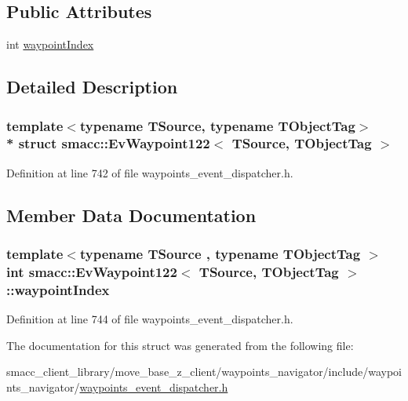 \subsection*{Public Attributes}
\begin{DoxyCompactItemize}
\item 
int \hyperlink{structsmacc_1_1EvWaypoint122_ab19c2e0159c29b6f95de8b4f071c6e8a}{waypoint\+Index}
\end{DoxyCompactItemize}


\subsection{Detailed Description}
\subsubsection*{template$<$typename T\+Source, typename T\+Object\+Tag$>$\\*
struct smacc\+::\+Ev\+Waypoint122$<$ T\+Source, T\+Object\+Tag $>$}



Definition at line 742 of file waypoints\+\_\+event\+\_\+dispatcher.\+h.



\subsection{Member Data Documentation}
\subsubsection[{\texorpdfstring{waypoint\+Index}{waypointIndex}}]{\setlength{\rightskip}{0pt plus 5cm}template$<$typename T\+Source , typename T\+Object\+Tag $>$ int {\bf smacc\+::\+Ev\+Waypoint122}$<$ T\+Source, T\+Object\+Tag $>$\+::waypoint\+Index}\hypertarget{structsmacc_1_1EvWaypoint122_ab19c2e0159c29b6f95de8b4f071c6e8a}{}\label{structsmacc_1_1EvWaypoint122_ab19c2e0159c29b6f95de8b4f071c6e8a}


Definition at line 744 of file waypoints\+\_\+event\+\_\+dispatcher.\+h.



The documentation for this struct was generated from the following file\+:\begin{DoxyCompactItemize}
\item 
smacc\+\_\+client\+\_\+library/move\+\_\+base\+\_\+z\+\_\+client/waypoints\+\_\+navigator/include/waypoints\+\_\+navigator/\hyperlink{waypoints__event__dispatcher_8h}{waypoints\+\_\+event\+\_\+dispatcher.\+h}\end{DoxyCompactItemize}
